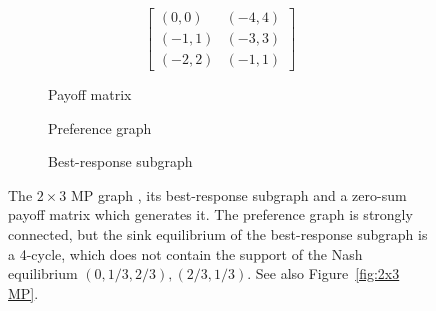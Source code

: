 \documentclass[preprint,authoryear]{elsarticle}
\begin{document}
\begin{figure}
    \centering
    \begin{subfigure}{.3\textwidth}
        \centering
        \begin{equation*}
            \begin{bmatrix}
                (0,0) & (-4,4) \\
                (-1,1) & (-3,3) \\
                (-2,2) & (-1,1)
            \end{bmatrix}
        \end{equation*}
        \caption{Payoff matrix}
        \label{fig:2x3 MP generator}
    \end{subfigure}
    \begin{subfigure}{.3\textwidth}
        \centering
        
        \caption{Preference graph}
        \label{fig:2x3MP comp}
    \end{subfigure}
    \begin{subfigure}{.3\textwidth}
        \centering
        
        \caption{Best-response subgraph}
        \label{fig:2x3MP best response}
    \end{subfigure}
    \caption{The $2\times 3$ MP graph \citep{biggar_graph_2023}, its best-response subgraph and a zero-sum payoff matrix which generates it. The preference graph is strongly connected, but the sink equilibrium of the best-response subgraph is a 4-cycle, which does not contain the support of the Nash equilibrium $(0,1/3,2/3), (2/3,1/3)$. See also Figure~\ref{fig:2x3 MP}.}
    \label{fig:2x3 MP and BR}
\end{figure}
\end{document}
